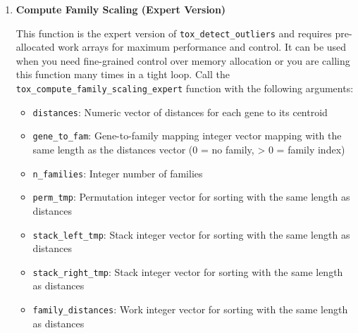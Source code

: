\begin{enumerate}
\begin{enumerate}
            \item \textbf{Compute Family Scaling (Expert Version)}
                  
                  This function is the expert version of \texttt{tox\_detect\_outliers}
                  and requires pre-allocated work arrays for maximum performance and
                  control. It can be used when you need fine-grained control over memory
                  allocation or you are calling this function many times in a tight loop.
                  Call the \texttt{tox\_compute\_family\_scaling\_expert} function with the
                  following arguments:
                  
                  \begin{itemize}
                    \item \texttt{distances}: Numeric vector of distances for each gene to
                          its centroid
                          
                    \item \texttt{gene\_to\_fam}: Gene-to-family mapping integer vector mapping
                          with the same length as the distances vector (0 = no family, \textgreater
                          0 = family index)
                          
                    \item \texttt{n\_families}: Integer number of families
                          
                    \item \texttt{perm\_tmp}: Permutation integer vector for sorting with
                          the same length as distances
                          
                    \item \texttt{stack\_left\_tmp}: Stack integer vector for sorting with
                          the same length as distances
                          
                    \item \texttt{stack\_right\_tmp}: Stack integer vector for sorting with
                          the same length as distances
                          
                    \item \texttt{family\_distances}: Work integer vector for sorting with
                          the same length as distances
                  \end{itemize}
                  

\end{enumerate}
\end{enumerate}
